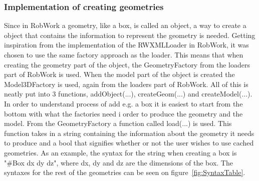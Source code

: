 \subsubsection{Implementation of creating geometries}
Since in RobWork a geometry, like a box, is called an object, a way to create a object that contains the information to represent the geometry is needed. Getting inspiration from the implementation of the RWXMLLoader in RobWork, it was chosen to use the same factory approach as the loader. This means that when creating the geometry part of the object, the GeometryFactory from the loaders part of RobWork is used. When the model part of the object is created the Model3DFactory is used, again from the loaders part of RobWork. All of this is neatly put into 3 functions, addObject(...), createGeom(...) and createModel(...).\\

In order to understand process of add e.g. a box it is easiest to start from the bottom with what the factories need i order to produce the geometry and the model. From the GeometryFactory a function called load(...) is used. This function takes in a string containing the information about the geometry it needs to produce and a bool that signifies whether or not the user wishes to use cached geometries. As an example, the syntax for the string when creating a box is "\#Box dx dy dz", where dx, dy and dz are the dimensions of the box. The syntaxes for the rest of the geometries can be seen on figure~\ref{fig:SyntaxTable}.\\

